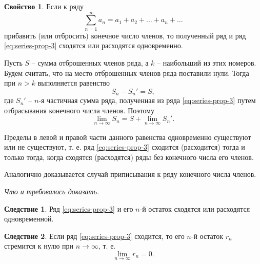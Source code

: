 \documentclass[a5paper, 11pt]{extbook}
\theoremstyle{definition}
\newtheorem{property}{Свойство}[section]
\theoremstyle{definition}
\theoremstyle{definition}
\newtheorem{consequence}{Следствие}[section]
\newcommand{\newpar}{$ $\par\nobreak\ignorespaces}
\renewenvironment{proof}{{\noindent\bfseries Доказательство.}}{\smallskip\newpar \hfill\textit{Что и требовалось доказать.}}
\begin{document}
\begin{property}
    Если к ряду
    \begin{equation}
        \label{eq:series-prop-3}
        \sum_{n = 1}^{\infty} a_n = a_1 + a_2 + \ldots + a_n + \ldots
    \end{equation}
    прибавить (или отбросить) конечное число членов, то полученный ряд и ряд \eqref{eq:series-prop-3} сходятся или расходятся одновременно.

    \begin{proof}
        Пусть \(S\) -- сумма отброшенных членов ряда, а \(k\) -- наибольший из этих номеров. Будем считать, что на место отброшенных членов ряда поставили нули. Тогда при \(n > k\) выполняется равенство
        \[
            S_n - S_n' = S,
        \]
        где \(S_n'\) -- \(n\)-я частичная сумма ряда, полученная из ряда \eqref{eq:series-prop-3} путем отбрасывания конечного числа членов. Поэтому
        \[
            \lim_{n \to \infty} S_n = S + \lim_{n \to \infty} S_n'.
        \]

        Пределы в левой и правой части данного равенства одновременно существуют или не существуют, т. е. ряд \eqref{eq:series-prop-3} сходится (расходится) тогда и только тогда, когда сходятся (расходятся) ряды без конечного числа его членов.

        Аналогично доказывается случай приписывания к ряду конечного числа членов.
    \end{proof}
    \begin{consequence}
        Ряд \eqref{eq:series-prop-3} и его \(n\)-й остаток сходятся или расходятся одновременной.
    \end{consequence}
    \begin{consequence}
        Если ряд \eqref{eq:series-prop-3} сходится, то его \(n\)-й остаток \(r_n\) стремится к нулю при \(n \to \infty\), т. е.
        \[
            \lim_{n \to \infty} r_n = 0.
        \]
    \end{consequence}
\end{property}
\end{document}
